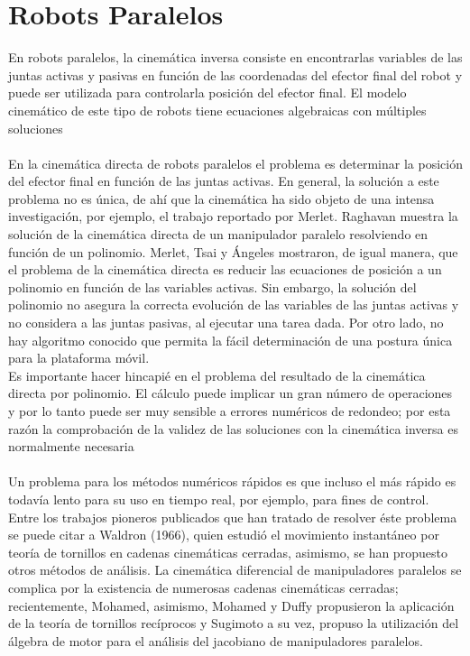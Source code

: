 \documentclass[letter,openright,12pt,spanish]{report}
\begin{document}
\section{Robots Paralelos}
En robots paralelos, la cinemática inversa consiste en encontrarlas variables de las juntas activas y pasivas en función de las coordenadas del efector final del robot y puede ser utilizada para controlarla posición del efector final. El modelo cinemático de este tipo de robots tiene ecuaciones algebraicas con múltiples soluciones\\
\\
En la cinemática directa de robots paralelos el problema es determinar la posición del efector final en función de las juntas activas. En general, la solución a este problema no es única, de ahí que la cinemática ha sido objeto de una intensa investigación, por ejemplo, el trabajo reportado por Merlet. Raghavan muestra la solución de la cinemática directa de un manipulador paralelo resolviendo en función de un polinomio. Merlet, Tsai y Ángeles mostraron, de igual manera, que el problema de la cinemática directa es reducir las ecuaciones de posición a un polinomio en función de las variables activas. Sin embargo, la solución del polinomio no asegura la correcta evolución de las variables de las juntas activas y no considera a las juntas pasivas, al ejecutar una tarea dada. Por otro lado, no hay algoritmo conocido que permita la fácil determinación de una postura única para la plataforma móvil.\\
Es importante hacer hincapié en el problema del resultado de la cinemática directa por polinomio. El cálculo puede implicar un gran número de operaciones y por lo tanto puede ser muy sensible a errores numéricos de redondeo; por esta razón la comprobación de la validez de las soluciones con la cinemática inversa es normalmente necesaria\\
\\
Un problema para los métodos numéricos rápidos es que incluso el más rápido es todavía lento para su uso en tiempo real, por ejemplo, para fines de control. Entre los trabajos pioneros publicados que han tratado de resolver éste problema se puede citar a Waldron (1966), quien estudió el movimiento instantáneo por teoría de tornillos en cadenas cinemáticas cerradas, asimismo, se han propuesto otros métodos de análisis. La cinemática diferencial de manipuladores paralelos se complica por la existencia de numerosas cadenas cinemáticas cerradas; recientemente, Mohamed, asimismo, Mohamed y Duffy propusieron la aplicación de la teoría de tornillos recíprocos y Sugimoto a su vez, propuso la utilización del álgebra de motor para el análisis del jacobiano de manipuladores paralelos.\\
\end{document}
